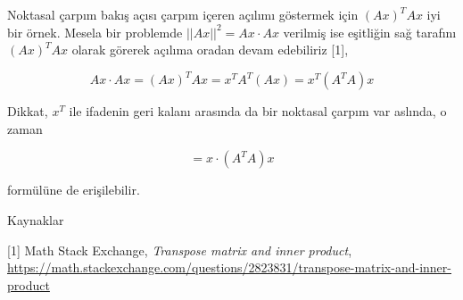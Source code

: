 \documentclass[12pt,fleqn]{article}\usepackage{../../common}
\begin{document}
Noktasal çarpım bakış açısı çarpım içeren açılımı göstermek için $(Ax)^T Ax$ iyi
bir örnek. Mesela bir problemde $||Ax||^2 = Ax \cdot Ax$ verilmiş ise eşitliğin
sağ tarafını $(Ax)^T Ax$ olarak görerek açılıma oradan devam edebiliriz [1], 

$$
Ax \cdot Ax = (Ax)^T Ax = x^T A^T (Ax) =
x^T (A^T A) x 
$$

Dikkat, $x^T$ ile ifadenin geri kalanı arasında da bir noktasal çarpım var
aslında, o zaman

$$
= x \cdot (A^T A) x
$$

formülüne de erişilebilir.


Kaynaklar

[1] Math Stack Exchange, {\em Transpose matrix and inner product},
    \url{https://math.stackexchange.com/questions/2823831/transpose-matrix-and-inner-product}
\end{document}
